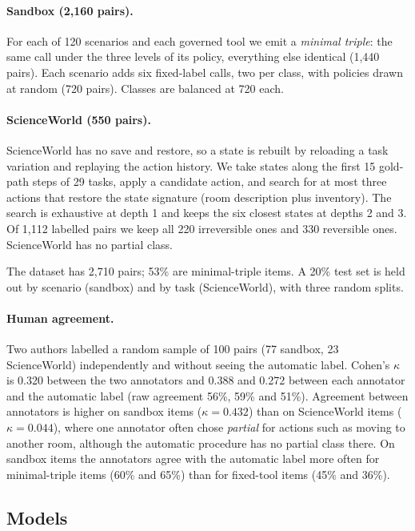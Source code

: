 \documentclass[11pt]{article}
\begin{document}
\paragraph{Sandbox (2,160 pairs).} For each of 120 scenarios and each governed tool we emit a
\emph{minimal triple}: the same call under the three levels of its policy, everything else
identical (1,440 pairs). Each scenario adds six fixed-label calls, two per class, with policies
drawn at random (720 pairs). Classes are balanced at 720 each.

\paragraph{ScienceWorld (550 pairs).} ScienceWorld \citep{wang2022scienceworld} has no save and
restore, so a state is rebuilt by reloading a task variation and replaying the action history.
We take states along the first 15 gold-path steps of 29 tasks, apply a candidate action, and
search for at most three actions that restore the state signature (room description plus
inventory). The search is exhaustive at depth 1 and keeps the six closest states at depths 2 and
3. Of 1,112 labelled pairs we keep all 220 irreversible ones and 330 reversible ones.
ScienceWorld has no partial class.

The dataset has 2,710 pairs; 53\% are minimal-triple items. A 20\% test set is held out by
scenario (sandbox) and by task (ScienceWorld), with three random splits.

\paragraph{Human agreement.} Two authors labelled a random sample of 100 pairs (77 sandbox, 23
ScienceWorld) independently and without seeing the automatic label. Cohen's $\kappa$ is 0.320
between the two annotators and 0.388 and 0.272 between each annotator and the automatic label
(raw agreement 56\%, 59\% and 51\%). Agreement between annotators is higher on sandbox items
($\kappa = 0.432$) than on ScienceWorld items ($\kappa = 0.044$), where one annotator often chose
\emph{partial} for actions such as moving to another room, although the automatic procedure has no
partial class there. On sandbox items the annotators agree with the automatic label more often for
minimal-triple items (60\% and 65\%) than for fixed-tool items (45\% and 36\%).

\subsection{Models}
\end{document}
